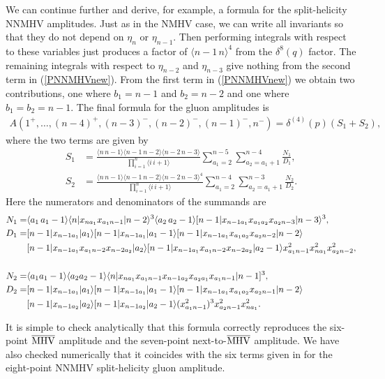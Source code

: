 \documentclass[12pt]{article}
\def\l<{\langle}\def\r>{\rangle}
\def\bMHV{\overline{\rm MHV}}
\begin{document}
{We can continue further and derive, for example, a formula for the split-helicity NNMHV amplitudes. Just as in the NMHV case, we can write all invariants so that they do not depend on $\eta_{n}$ or $\eta_{n-1}$. Then performing integrals with respect to these variables just produces a factor of $\l< n-1\, n\r>^4$ from the $\delta^8(q)$ factor. The remaining integrals with respect to $\eta_{n-2}$ and $\eta_{n-3}$ give nothing from the second term in (\ref{PNNMHVnew}). From the first term in (\ref{PNNMHVnew}) we obtain two contributions, one where $b_1=n-1$ and $b_2=n-2$ and one where $b_1=b_2=n-1$. The final formula for the gluon amplitudes is
\begin{align}
A(1^+,\ldots,(n-4)^+,(n-3)^-,(n-2)^-,(n-1)^-,n^-) = \delta^{(4)}(p) (S_1 + S_2),
\end{align}
where the two terms are given by
\begin{align}
S_1 &= \frac{\l<n\, n-1\r> \l<n-1 \, n-2\r> \l< n-2 \, n-3\r>}{\prod_{i=1}^n \l< i \, i+1 \r>}\sum_{a_1=2}^{n-5} \sum_{a_2=a_1+1}^{n-4} \frac{N_1}{D_1}, \\
S_2 &= \frac{\l<n \, n-1\r> \l<n-1 \, n-2\r> \l<n-2 \, n-3\r>^4}{\prod_{i=1}^n \l< i \, i+1 \r>}\sum_{a_1=2}^{n-4} \sum_{a_2=a_1+1}^{n-3} \frac{N_2}{D_2}.
\end{align}
Here the numerators and denominators of the summands are
\begin{align}
N_1 = &\l<a_1 \, a_1-1\r>  \l<n |x_{na_1} x_{a_1 n-1}|n-2\r>^3 \l< a_2 \,a_2-1\r>  [n-1|x_{n-1 a_1}x_{a_1 a_2}x_{a_2 n-3} |n-3\r>^3,
\\ D_1=&[n-1|x_{n-1 a_1}|a_1\r> [n-1| x_{n-1 a_1}|a_1-1\r>  [n-1|x_{n-1 a_1}x_{a_1a_2}x_{a_2n-2}|n-2\r> \notag\\
&[n-1|x_{n-1 a_1} x_{a_1 n-2} x_{n-2 a_2}|a_2\r> [n-1|x_{n-1 a_1} x_{a_1 n-2} x_{n-2 a_2}|a_2-1\r>x_{a_1 n-1}^2 x_{n a_1}^2 x_{a_2 n-2}^2,\\
\notag \\
N_2 =&\l <a_1 a_1-1\r> \l<a_2 a_2-1\r> \l<n|x_{na_1} x_{a_1 n-1} x_{n-1 a_2} x_{a_2 a_1} x_{a_1 n-1} | n-1]^3 ,\\
D_2 =&[n-1|x_{n-1 a_1}|a_1\r> [n-1|x_{n-1 a_1}|a_1-1\r>  [n-1|x_{n-1 a_1} x_{a_1 a_2} x_{a_2 n-1} |n-2 \r>\notag\\
&[n-1|x_{n-1 a_2} |a_2\r> [n-1|x_{n-1 a_2}|a_2-1\r> (x_{a_1 n-1}^2)^3 x_{a_2 n-1}^2 x_{n a_1}^2.
\end{align}

It is simple to check analytically that this formula correctly reproduces the six-point $\bMHV$ amplitude and the seven-point next-to-$\bMHV$ amplitude. We have also checked numerically that it coincides with the six terms given in \cite{Britto:2005dg} for the eight-point NNMHV split-helicity gluon amplitude.

}
\end{document}
